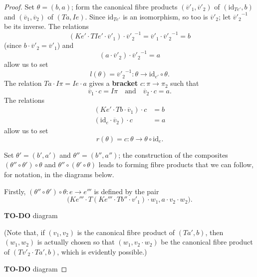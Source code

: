 \documentclass[fleqn]{article}
\newcommand{\oldpage}[1]{\marginpar{\footnotesize$\Big\vert$ \textit{p.~#1}}}
\newcommand{\todo}{{\color{purple}\textbf{TO-DO }}}
\newcommand{\unsure}[1]{{\color{purple}\textbf{#1}}}
\newcommand{\id}{\mathrm{id}}
\newcommand{\textand}{\quad\text{and}\quad}
\begin{document}
\begin{proof}
  Set $\theta=(b,a)$;
  form the canonical fibre products $(\overline{v}'_1,\overline{v}'_2)$ of $(\id_{Te'},b)$ and $(\overline{v}_1,\overline{v}_2)$ of $(Ta,Ie)$.
  Since $\id_{Te'}$ is an isomorphism, so too is $\overline{v}'_2$;
  let ${\overline{v}'_2}^{-1}$ be its inverse.
  The relations
  \[
    (Ke'\cdot TIe'\cdot\overline{v}'_1)\cdot{\overline{v}'_2}^{-1}
    = \overline{v}'_1\cdot{\overline{v}'_2}^{-1}
    = b
  \]
  (since $b\cdot\overline{v}'_2=\overline{v}'_1$) and
  \[
    (a\cdot\overline{v}'_2)\cdot{\overline{v}'_2}^{-1}
    = a
  \]
  allow us to set
  \[
    l(\theta)
    = {\overline{v}'_2}^{-1}
    \colon\theta
    \to \id_{e'}\circ\theta.
  \]
  The relation $Ta\cdot I\pi=Ie\cdot a$ gives a \unsure{bracket} $c\colon\pi\to\pi_2$ such that
  \[
    \overline{v}_1\cdot c = I\pi
    \textand
    \overline{v}_2\cdot c = a.
  \]
  The relations
  \[
    \begin{aligned}
      (Ke'\cdot Tb\cdot\overline{v}_1)\cdot c
      &= b
    \\(\id_e\cdot\overline{v}_2)\cdot c
      &= a
    \end{aligned}
  \]
  allow us to set
  \[
    r(\theta)
    = c
    \colon\theta
    \to\theta\circ\id_e.
  \]

  Set $\theta'=(b',a')$ and $\theta''=(b'',a'')$;
  the construction of the composites $(\theta''\circ\theta')\circ\theta$ and $\theta''\circ(\theta'\circ\theta)$ leads to forming fibre products that we can follow, for notation, in the diagrams below.

  \oldpage{32}
  Firstly, $(\theta''\circ\theta')\circ\theta\colon e\to e'''$ is defined by the pair
  \[
    \big(
      Ke'''\cdot T(Ke'''\cdot Tb''\cdot v'_1)\cdot w_1,
      a\cdot v_2\cdot w_2
    \big).
  \]

  \todo{diagram}

  (Note that, if $(v_1,v_2)$ is the canonical fibre product of $(Ta',b)$, then $(w_1,w_2)$ is actually chosen so that $(w_1,v_2\cdot w_2)$ be the canonical fibre product of $(Tv'_2\cdot Ta',b)$, which is evidently possible.)

  \todo{diagram}


\end{proof}
\end{document}
